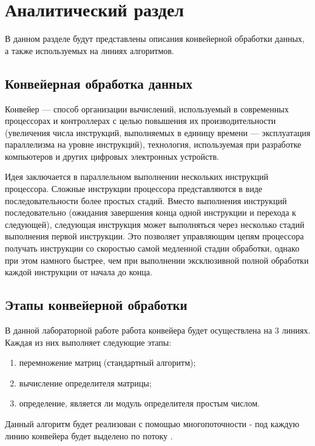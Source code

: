 \chapter{Аналитический раздел}

В данном разделе будут представлены описания конвейерной обработки данных, а также используемых на линиях алгоритмов.

\section{Конвейерная обработка данных}

Конвейер \cite{pipeline} — способ организации вычислений, используемый в современных процессорах и контроллерах с целью повышения их производительности (увеличения числа инструкций, выполняемых в единицу времени — эксплуатация параллелизма на уровне инструкций), технология, используемая при разработке компьютеров и других цифровых электронных устройств. 

Идея заключается в параллельном выполнении нескольких инструкций процессора. Сложные инструкции процессора представляются в виде последовательности более простых стадий. Вместо выполнения инструкций последовательно (ожидания завершения конца одной инструкции и перехода к следующей), следующая инструкция может выполняться через несколько стадий выполнения первой инструкции. Это позволяет управляющим цепям процессора получать инструкции со скоростью самой медленной стадии обработки, однако при этом намного быстрее, чем при выполнении эксклюзивной полной обработки каждой инструкции от начала до конца.

\section{Этапы конвейерной обработки}

В данной лабораторной работе работа конвейера будет осуществлена на 3 линиях. Каждая из них выполняет следующие этапы:
\begin{enumerate}
	\item перемножение матриц (стандартный алгоритм);
	\item вычисление определителя матрицы;
	\item определение, является ли модуль определителя простым числом.
\end{enumerate}

Данный алгоритм будет реализован с помощью многопоточности - под каждую линию конвейера будет выделено по потоку \cite{threads}.


